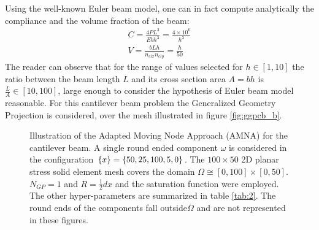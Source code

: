 Using the well-known Euler beam model, one can in fact compute analytically the compliance and the volume fraction of the beam:
\begin{eqnarray}
C=\frac{4PL^3}{Ebh^3}=\frac{4\times 10^6}{h^3}\\
V=\frac{bLh}{n_{elx}n_{ely}}=\frac{h}{50}
\end{eqnarray}
The reader can observe that for the range of values selected for $h\in[1,10]$ the ratio between the beam length $L$ and its cross section area $A=bh$ is $\frac{L}{A}\in[10,100]$, large enough to consider the hypothesis of Euler beam model reasonable.
For this cantilever beam problem the Generalized Geometry Projection is considered, over the mesh illustrated in figure \ref{fig:ggpcb_b}.
\begin{figure}[!ht]
\centering
    \caption{Illustration of the Adapted Moving Node Approach (AMNA)  for the cantilever beam. A single round ended component $\omega$ is considered in the configuration $\left\{{x}\right\}=\left\{{50,25,100,5,0}\right\}$. The $100\times 50$ 2D planar stress solid element mesh covers the domain $\Omega\cong  [0,100] \times [0,50]$.  $N_{GP}=1$ and $R=\frac{1}{2}dx$ and the saturation function were employed. The other hyper-parameters are summarized in table \ref{tab:2}. The round ends of the components fall outside$\Omega$ and are not represented in these figures. }%
    \label{fig:ggpcb}%
\end{figure}
